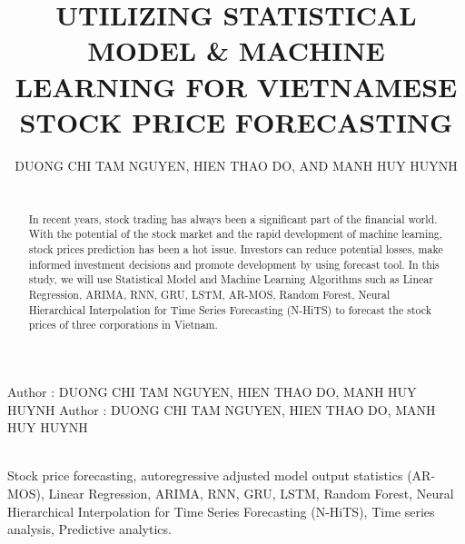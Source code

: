 \documentclass{ieeeojies}
\begin{document}
\title{UTILIZING STATISTICAL MODEL & MACHINE LEARNING FOR VIETNAMESE STOCK PRICE FORECASTING}

\author{\uppercase{DUONG CHI TAM NGUYEN},
\uppercase{HIEN THAO DO, and MANH HUY HUYNH}}

\address[1]{Faculty of Information Systems, University of Information Technology, (e-mail: 21520439@gm.uit.edu.vn)}
\address[2]{Faculty of Information Systems, University of Information Technology, (e-mail: 21520460@gm.uit.edu.vn)}
\address[3]{Faculty of Information Systems, University of Information Technology, (e-mail: 21520259@gm.uit.edu.vn)}

\markboth
{Author \headeretal: DUONG CHI TAM NGUYEN, HIEN THAO DO, MANH HUY HUYNH}
{Author \headeretal: DUONG CHI TAM NGUYEN, HIEN THAO DO, MANH HUY HUYNH}

\begin{abstract}
\\In recent years, stock trading has always been a significant part of the financial world. With the potential of the stock market and the rapid development of machine learning, stock prices prediction has been a hot issue. Investors can reduce potential losses, make informed investment decisions and promote development by using forecast tool. In this study, we will use Statistical Model and Machine Learning Algorithms such as Linear Regression, ARIMA, RNN, GRU, LSTM, AR-MOS, Random Forest, Neural Hierarchical Interpolation for Time Series Forecasting (N-HiTS) to forecast the stock prices of three corporations in Vietnam.
\end{abstract}

\begin{keywords}
\\Stock price forecasting, autoregressive adjusted model output statistics (AR-MOS),  Linear Regression, ARIMA, RNN, GRU, LSTM, Random Forest, Neural Hierarchical Interpolation for Time Series Forecasting (N-HiTS), Time series analysis, Predictive analytics.
\end{keywords}

\titlepgskip=-15pt

\maketitle
\end{document}

